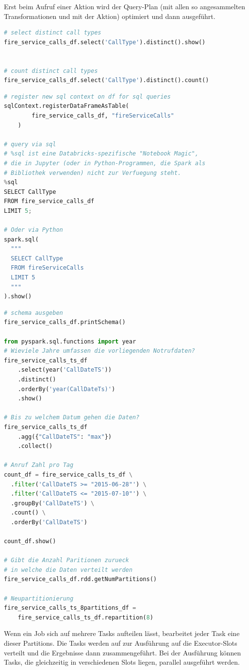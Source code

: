 \documentclass[../Main.tex]{subfiles}
\begin{document}
Erst beim Aufruf einer Aktion wird der Query-Plan (mit allen so angesammelten Transformationen und mit der Aktion)
optimiert und dann ausgeführt.

\begin{lstlisting}[language=Python]
# select distinct call types
fire_service_calls_df.select('CallType').distinct().show()


# count distinct call types
fire_service_calls_df.select('CallType').distinct().count()
\end{lstlisting}

\begin{lstlisting}[language=Python]
# register new sql context on df for sql queries
sqlContext.registerDataFrameAsTable(
        fire_service_calls_df, "fireServiceCalls"
    )

# query via sql
# %sql ist eine Databricks-spezifische "Notebook Magic", 
# die in Jupyter (oder in Python-Programmen, die Spark als 
# Bibliothek verwenden) nicht zur Verfuegung steht.
%sql
SELECT CallType
FROM fire_service_calls_df
LIMIT 5;

# Oder via Python
spark.sql(
  """
  SELECT CallType
  FROM fireServiceCalls
  LIMIT 5
  """
).show()
\end{lstlisting}


\begin{lstlisting}[language=Python]
# schema ausgeben
fire_service_calls_df.printSchema()

from pyspark.sql.functions import year
# Wieviele Jahre umfassen die vorliegenden Notrufdaten?
fire_service_calls_ts_df
    .select(year('CallDateTS'))
    .distinct()
    .orderBy('year(CallDateTs)')
    .show()

# Bis zu welchem Datum gehen die Daten?
fire_service_calls_ts_df
    .agg({"CallDateTS": "max"})
    .collect()

# Anruf Zahl pro Tag
count_df = fire_service_calls_ts_df \
  .filter('CallDateTS >= "2015-06-28"') \
  .filter('CallDateTS <= "2015-07-10"') \
  .groupBy('CallDateTS') \
  .count() \
  .orderBy('CallDateTS')

count_df.show()

# Gibt die Anzahl Paritionen zurueck
# in welche die Daten verteilt werden
fire_service_calls_df.rdd.getNumPartitions()

# Neupartitionierung
fire_service_calls_ts_8partitions_df = 
    fire_service_calls_ts_df.repartition(8)
\end{lstlisting}

Wenn ein Job sich auf mehrere Tasks aufteilen lässt, bearbeitet jeder Task eine dieser Partitions.
Die Tasks werden auf zur Ausführung auf die Executor-Slots verteilt und die Ergebnisse dann zusammengeführt.
Bei der Ausführung können Tasks, die gleichzeitig in verschiedenen Slots liegen, parallel ausgeführt werden.
\end{document}

